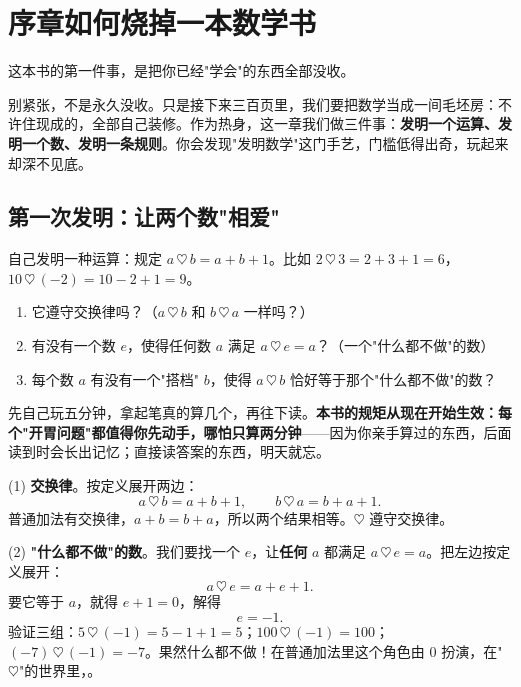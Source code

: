 \chapter*{序章\quad 如何烧掉一本数学书}

这本书的第一件事，是把你已经"学会"的东西全部没收。

别紧张，不是永久没收。只是接下来三百页里，我们要把数学当成一间毛坯房：不许住现成的，全部自己装修。作为热身，这一章我们做三件事：\textbf{发明一个运算、发明一个数、发明一条规则}。你会发现"发明数学"这门手艺，门槛低得出奇，玩起来却深不见底。

\section{第一次发明：让两个数"相爱"}

\begin{kaiwei}
自己发明一种运算：规定 $a \,\heartsuit\, b = a + b + 1$。比如 $2\,\heartsuit\,3 = 2+3+1 = 6$，$10\,\heartsuit\,(-2) = 10-2+1 = 9$。
\begin{enumerate}[label=(\arabic*)]
  \item 它遵守交换律吗？（$a\,\heartsuit\,b$ 和 $b\,\heartsuit\,a$ 一样吗？）
  \item 有没有一个数 $e$，使得任何数 $a$ 满足 $a \,\heartsuit\, e = a$？（一个"什么都不做"的数）
  \item 每个数 $a$ 有没有一个"搭档" $b$，使得 $a \,\heartsuit\, b$ 恰好等于那个"什么都不做"的数？
\end{enumerate}
\end{kaiwei}

先自己玩五分钟，拿起笔真的算几个，再往下读。\textbf{本书的规矩从现在开始生效：每个"开胃问题"都值得你先动手，哪怕只算两分钟}——因为你亲手算过的东西，后面读到时会长出记忆；直接读答案的东西，明天就忘。

(1) \textbf{交换律}。按定义展开两边：
\[
a\,\heartsuit\,b = a+b+1, \qquad b\,\heartsuit\,a = b+a+1 .
\]
普通加法有交换律，$a+b = b+a$，所以两个结果相等。$\heartsuit$ 遵守交换律。\checkmark

(2) \textbf{"什么都不做"的数}。我们要找一个 $e$，让\textbf{任何} $a$ 都满足 $a \,\heartsuit\, e = a$。把左边按定义展开：
\[
a \,\heartsuit\, e = a + e + 1 .
\]
要它等于 $a$，就得 $e + 1 = 0$，解得
\[
\boxed{e = -1} .
\]
验证三组：$5\,\heartsuit\,(-1) = 5 - 1 + 1 = 5$；$100\,\heartsuit\,(-1) = 100$；$(-7)\,\heartsuit\,(-1) = -7$。果然什么都不做！在普通加法里这个角色由 $0$ 扮演，在"$\heartsuit$"的世界里，。

